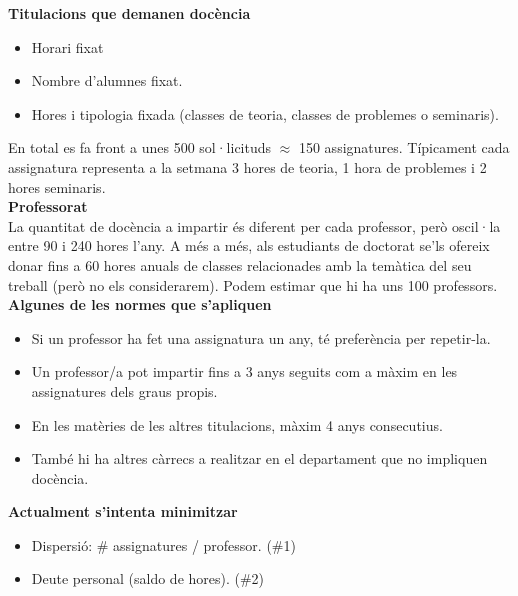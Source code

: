 \documentclass[10pt,twocolumn]{article}
\begin{document}
\begin{tcolorbox}[colback=black!1,title=\textbf{Dades del funcionament intern del \textit{model actual}},coltitle=black,colbacktitle=black!10]
	\textbf{Titulacions que demanen docència}
	\begin{itemize}
		\item Horari fixat
		\item Nombre d'alumnes fixat.
		\item Hores i tipologia fixada (classes de teoria, classes de problemes o seminaris).
	\end{itemize}
	En total es fa front a  unes 500 sol·licituds $\approx$ 150 assignatures. Típicament cada assignatura representa a la setmana 3 hores de teoria, 1 hora de problemes i 2 hores seminaris.
	\vspace{2mm}
	\\
	\textbf{Professorat}
	\\
	La quantitat de docència a impartir és diferent per cada professor, però oscil·la entre 90 i 240 hores l'any. A més a més, als estudiants de doctorat se'ls ofereix donar fins a 60 hores anuals de classes relacionades amb la temàtica del seu treball (però no els considerarem). Podem estimar que hi ha uns 100 professors.
	\vspace{2mm}
\\
	\textbf{Algunes de les normes que s'apliquen}
	\begin{itemize}
		\item Si un professor ha fet una assignatura un any, té preferència per repetir-la.
		\item Un professor/a pot impartir fins a 3 anys seguits com a màxim en les assignatures dels graus propis.
		\item En les matèries de les altres titulacions, màxim 4 anys consecutius.
		\item També hi ha altres càrrecs a realitzar en el departament que no impliquen docència.
	\end{itemize}
	\textbf{Actualment s'intenta minimitzar}
	\begin{itemize}
		\item Dispersió: \# assignatures / professor. (\#1)
		\item Deute personal (saldo de hores). (\#2)
	\end{itemize}
	\end{tcolorbox}
\end{document}
